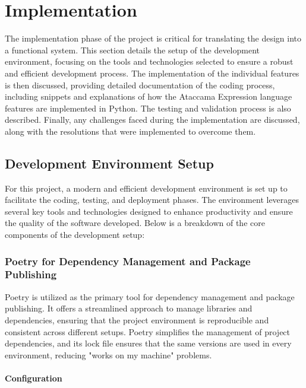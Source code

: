 
\chapter{Implementation}

The implementation phase of the project is critical for translating the design into a functional system. This section details the setup of the development environment, focusing on the tools and technologies selected to ensure a robust and efficient development process. The implementation of the individual features is then discussed, providing detailed documentation of the coding process, including snippets and explanations of how the Ataccama Expression language features are implemented in Python. The testing and validation process is also described. Finally, any challenges faced during the implementation are discussed, along with the resolutions that were implemented to overcome them.

\section{Development Environment Setup}

For this project, a modern and efficient development environment is set up to facilitate the coding, testing, and deployment phases. The environment leverages several key tools and technologies designed to enhance productivity and ensure the quality of the software developed. Below is a breakdown of the core components of the development setup:

\subsection{Poetry for Dependency Management and Package Publishing}

Poetry is utilized as the primary tool for dependency management and package publishing. It offers a streamlined approach to manage libraries and dependencies, ensuring that the project environment is reproducible and consistent across different setups. Poetry simplifies the management of project dependencies, and its lock file ensures that the same versions are used in every environment, reducing "works on my machine" problems.

\subsubsection{Configuration}

